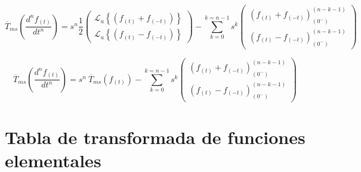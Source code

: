 \documentclass[12pt]{article}
\begin{document}
$$\overline{T}_{ms}\left(\frac{d^n f_{(t)}}{dt^n}\right) =s^n \frac12
\begin{pmatrix}
\mathcal{L}_u\left\{(f_{(t)} + f_{(-t)})\right\} \\[0.5 cm]
\mathcal{L}_u\left\{(f_{(t)} - f_{(-t)})\right\} 
\end{pmatrix}
- \sum\limits_{k=0}^{k=n-1} s^k
\begin{pmatrix}
 (f_{(t)} + f_{(-t)})^{(n-k-1)}_{(0^-)}\\[0.5 cm]
 (f_{(t)} - f_{(-t)})^{(n-k-1)}_{(0^-)}
\end{pmatrix}
$$

$$\overline{T}_{ms}\left(\frac{d^n f_{(t)}}{dt^n}\right) =s^n\  \overline{T}_{ms}(f_{(t)})
- \sum\limits_{k=0}^{k=n-1} s^k
\begin{pmatrix}
 (f_{(t)} + f_{(-t)})^{(n-k-1)}_{(0^-)}\\[0.5 cm]
 (f_{(t)} - f_{(-t)})^{(n-k-1)}_{(0^-)}
\end{pmatrix}
$$

\section{Tabla de transformada de funciones elementales}
\end{document}
